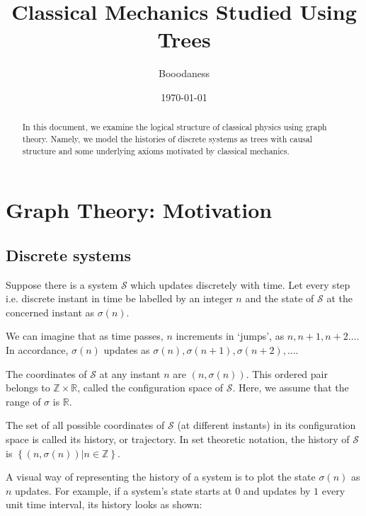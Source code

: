 \documentclass[12 pt]{article}
\title{Classical Mechanics Studied Using Trees}
\author{Booodaness}
\date{\today}
\begin{document}

\begin{titlepage}
\maketitle
\begin{abstract}
In this document, we examine the logical structure of classical physics using graph theory. Namely, we model the histories of discrete systems as trees with causal structure and some underlying axioms motivated by classical mechanics.
\end{abstract}
\end{titlepage}

\setcounter{page}{2}

\tableofcontents

\clearpage
{}

\section{Graph Theory: Motivation}

\subsection{Discrete systems}

Suppose there is a system $\mathcal{S}$ which updates discretely with time. Let every step i.e. discrete instant in time be labelled by an integer $n$ and the state of $\mathcal{S}$ at the concerned instant as $\sigma \left( n \right)$.

We can imagine that as time passes, $n$ increments in `jumps', as $n, n+1, n+2 \dots$. In accordance, $\sigma \left( n \right)$ updates as $\sigma \left( n \right), \sigma \left( n+1 \right), \sigma \left( n+2 \right), \dots$.

The coordinates of $\mathcal{S}$ at any instant $n$ are $\left( n, \sigma \left( n \right) \right)$. This ordered pair belongs to $\mathbb{Z} \times \mathbb{R}$, called the configuration space of $\mathcal{S}$. Here, we assume that the range of $\sigma$ is $\mathbb{R}$.

The set of all possible coordinates of $\mathcal{S}$ (at different instants) in its configuration space is called its history, or trajectory. In set theoretic notation, the history of $\mathcal{S}$ is $\left\{ \left( n, \sigma \left( n \right) \right) \vert n \in \mathbb{Z} \right\}$.

A visual way of representing the history of a system is to plot the state $\sigma \left( n \right)$ as $n$ updates. For example, if a system's state starts at $0$ and updates by $1$ every unit time interval, its history looks as shown:
\end{document}
